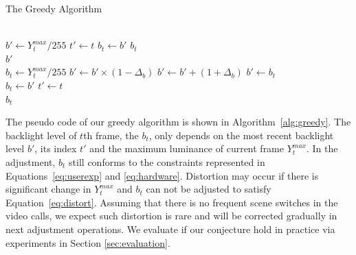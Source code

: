 \begin{algorithm}[t]
  \caption{The Greedy Algorithm}
  \label{alg:greedy}
  \begin{algorithmic}[1]
    \\
      \State $b' \gets Y_{t}^{max} / 255$
      \State $t' \gets t$
      \State $b_t \gets b'$
      \Return $b_t$
    \EndIf
      \\
      \Return $b'$
    \EndIf
    \\

    \State $b_{t} \gets Y_{t}^{max} / 255$
      \State $b' \gets b' \times (1 - \Delta_{b})$
      \State $b' \gets b' + (1 + \Delta_{b})$
    \Else
      \State $b' \gets b_t$
    \EndIf
    \\
    \State $b_{t} \gets b'$
    \State $t' \gets t$\\
    \Return $b_{t}$
  \end{algorithmic}
\end{algorithm}

The pseudo code of our greedy algorithm is shown in
Algorithm~\ref{alg:greedy}. The backlight level of $t$th frame, the
$b_t$, only depends on the most recent backlight level $b'$, its
index $t'$ and the maximum luminance of current frame $Y_t^{max}$. In
the adjustment, $b_t$ still conforms to the constraints represented
in Equations~\ref{eq:userexp} and \ref{eq:hardware}. Distortion may
occur if there is significant change in $Y_t^{max}$ and $b_t$ can not be adjusted to satisfy
Equation~\ref{eq:distort}. Assuming that there is no
frequent scene switches in the video calls, we expect such distortion
is rare and will be
corrected gradually in next adjustment operations. We evaluate if
our conjecture hold in practice via experiments in Section \ref{sec:evaluation}. 







